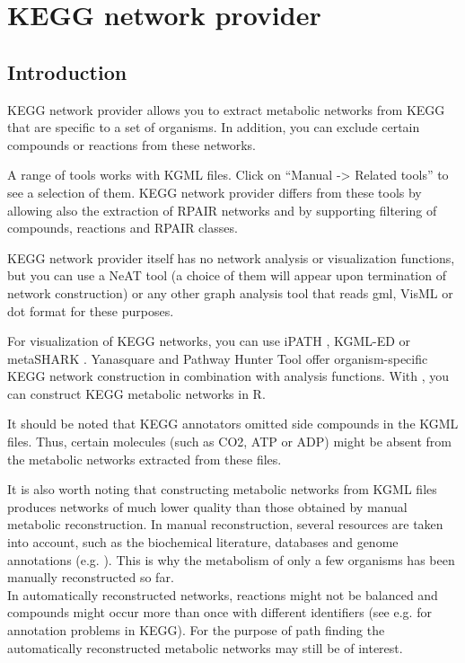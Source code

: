 \chapter{KEGG network provider}

\section{Introduction}

KEGG network provider allows you to extract metabolic networks from KEGG \cite{Kanehisa2008} that are specific to a set of organisms.
In addition, you can exclude certain compounds or reactions from these networks.

A range of tools works with KGML files. Click on ``Manual -> Related tools'' to see a selection of them.
KEGG network provider differs from these tools by allowing also the extraction of RPAIR networks and by supporting
filtering of compounds, reactions and RPAIR classes.

KEGG network provider itself has no network analysis or visualization functions,
but you can use a NeAT tool (a choice of them will appear upon termination of network construction)
or any other graph analysis tool that reads gml, VisML or dot format for these purposes.

For visualization of KEGG networks, you can use iPATH \cite{ipath}, KGML-ED \cite{kgmled} or
metaSHARK \cite{metashark}.
Yanasquare \cite{yana} and Pathway Hunter Tool \cite{pht} offer
organism-specific KEGG network construction in combination
with analysis functions. With \cite{kegggrah}, you can construct KEGG metabolic networks in R.

It should be noted that KEGG annotators omitted side compounds in the KGML files. Thus, certain molecules
(such as CO2, ATP or ADP) might be absent from the metabolic networks extracted from these files.

It is also worth noting that constructing metabolic networks from KGML files produces networks of much lower quality
than those obtained by manual metabolic reconstruction. In manual reconstruction, several resources are taken into account,
such as the biochemical literature, databases and genome annotations (e.g. \cite{Foerster2003}). This is why
the metabolism of only a few organisms has been manually reconstructed so far.\\
In automatically reconstructed networks, reactions might not be balanced and compounds might occur more
than once with different identifiers (see e.g. \cite{Poolman2006} for annotation problems in KEGG).
For the purpose of path finding the automatically reconstructed metabolic networks may still be of interest.

